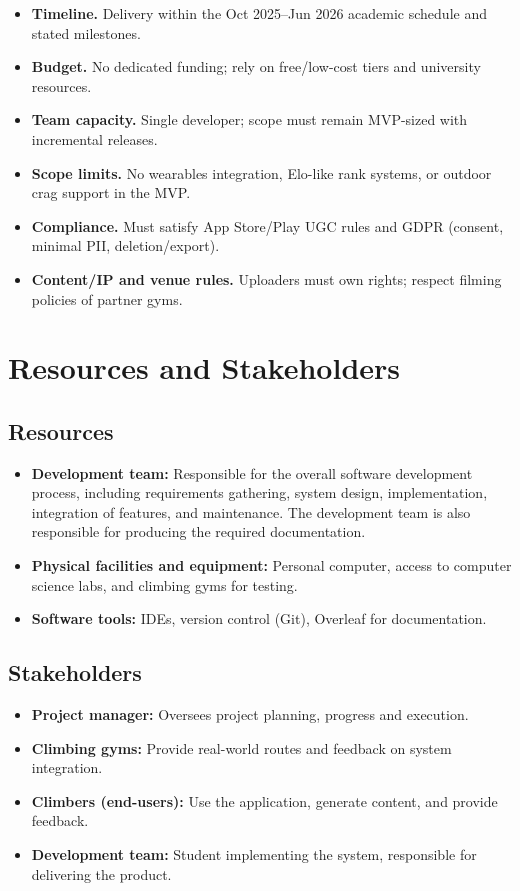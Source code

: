 \documentclass[12pt,a4paper]{report}
\renewcommand\_{\textunderscore\hspace{0pt}}
\begin{document}
\begin{itemize}[noitemsep]
    \item \textbf{Timeline.} Delivery within the Oct 2025--Jun 2026 academic schedule and stated milestones.
    \item \textbf{Budget.} No dedicated funding; rely on free/low-cost tiers and university resources.
    \item \textbf{Team capacity.} Single developer; scope must remain MVP-sized with incremental releases.
    \item \textbf{Scope limits.} No wearables integration, Elo-like rank systems, or outdoor crag support in the MVP.
    \item \textbf{Compliance.} Must satisfy App Store/Play UGC rules and GDPR (consent, minimal PII, deletion/export).
    \item \textbf{Content/IP and venue rules.} Uploaders must own rights; respect filming policies of partner gyms.
\end{itemize}

\section{Resources and Stakeholders}

\subsection{Resources}

\begin{itemize}[noitemsep]
    \item \textbf{Development team:} Responsible for the overall software development process, including requirements gathering, system design, implementation, integration of features, and maintenance. The development team is also responsible for producing the required documentation.
    \item \textbf{Physical facilities and equipment:} Personal computer, access to computer science labs, and climbing gyms for testing.
    \item \textbf{Software tools:} IDEs, version control (Git), Overleaf for documentation.
\end{itemize}

\subsection{Stakeholders}

\begin{itemize}[noitemsep]
    \item \textbf{Project manager:} Oversees project planning, progress and execution.
    \item \textbf{Climbing gyms:} Provide real-world routes and feedback on system integration.
    \item \textbf{Climbers (end-users):} Use the application, generate content, and provide feedback.
    \item \textbf{Development team:} Student implementing the system, responsible for delivering the product.
\end{itemize}
\end{document}
